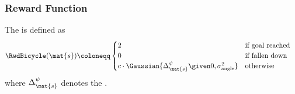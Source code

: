 
\begin{frame}[label=solution_reward]
    \frametitle{Reward Function}

    \begin{definition}
        The  is defined as
        \begin{align}
            \RwdBicycle(\mat{s}) &\coloneqq \begin{cases}
                    2 & \text{if goal reached} \\
                    0 & \text{if fallen down} \\
                    c\cdot\Gaussian{\Delta^\psi_{\mat{s}} \given 0, \sigma_{\text{angle}}^2} & \text{otherwise}
                \end{cases}
        \end{align}
    where $\Delta^\psi_{\mat{s}}$ denotes the .
    \end{definition}
    \vspace{2ex}
    \centering
    
\end{frame}


